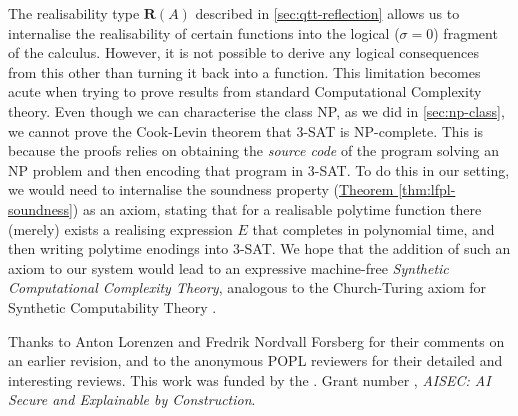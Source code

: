 \documentclass[acmsmall,screen]{acmart}
\newcommand{\thmref}[1]{\hyperref[#1]{Theorem \ref*{#1}}}
\begin{document}
The realisability type $\mathbf{R}(A)$ described in
\autoref{sec:qtt-reflection} allows us to internalise the
realisability of certain functions into the logical ($\sigma = 0$)
fragment of the calculus. However, it is not possible to derive any
logical consequences from this other than turning it back into a
function. This limitation becomes acute when trying to prove results
from standard Computational Complexity theory. Even though we can
characterise the class NP, as we did in \autoref{sec:np-class}, we
cannot prove the Cook-Levin theorem that 3-SAT is NP-complete. This is
because the proofs relies on obtaining the \emph{source code} of the
program solving an NP problem and then encoding that program in
3-SAT. To do this in our setting, we would need to internalise the
soundness property (\thmref{thm:lfpl-soundness}) as an axiom, stating
that for a realisable polytime function there (merely) exists a
realising expression $E$ that completes in polynomial time, and then
writing polytime enodings into 3-SAT. We hope that the addition of
such an axiom to our system would lead to an expressive machine-free
\emph{Synthetic Computational Complexity Theory}, analogous to the
Church-Turing axiom for Synthetic Computability Theory \cite{Bauer06}.

\begin{acks}
  Thanks to Anton Lorenzen and Fredrik Nordvall Forsberg for their
  comments on an earlier revision, and to the anonymous POPL reviewers
  for their detailed and interesting reviews. This work was funded by
  the . Grant number
  , \emph{AISEC: AI Secure and
    Explainable by Construction}.
\end{acks}



\end{document}
